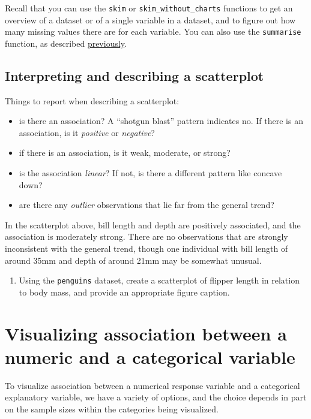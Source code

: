 \documentclass[
]{book}
\providecommand{\tightlist}{%
  \setlength{\itemsep}{0pt}\setlength{\parskip}{0pt}}
\begin{document}
Recall that you can use the \texttt{skim} or \texttt{skim\_without\_charts} functions to get an overview of a dataset or of a single variable in a dataset, and to figure out how many missing values there are for each variable. You can also use the \texttt{summarise} function, as described \hyperref[mean_sd]{previously}.

\subsection{Interpreting and describing a scatterplot}\label{interpret_scatter}

Things to report when describing a scatterplot:

\begin{itemize}
\tightlist
\item
  is there an association? A ``shotgun blast'' pattern indicates no. If there is an association, is it \emph{positive} or \emph{negative}?
\item
  if there is an association, is it weak, moderate, or strong?
\item
  is the association \emph{linear}? If not, is there a different pattern like concave down?
\item
  are there any \emph{outlier} observations that lie far from the general trend?
\end{itemize}

In the scatterplot above, bill length and depth are positively associated, and the association is moderately strong. There are no observations that are strongly inconsistent with the general trend, though one individual with bill length of around 35mm and depth of around 21mm may be somewhat unusual.

\begin{enumerate}
\def\labelenumi{\arabic{enumi}.}
\tightlist
\item
  Using the \texttt{penguins} dataset, create a scatterplot of flipper length in relation to body mass, and provide an appropriate figure caption.
\end{enumerate}

\section{Visualizing association between a numeric and a categorical variable}\label{numeric_vs_cat}

To visualize association between a numerical response variable and a categorical explanatory variable, we have a variety of options, and the choice depends in part on the sample sizes within the categories being visualized.
\end{document}

